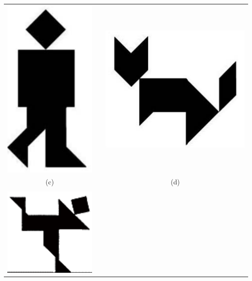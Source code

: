 \begin{problem}
\begin{center}
\begin{tabular}{ccc}
\includegraphics[scale=0.4]{tangram3} & 
\qquad \qquad\qquad& 
\includegraphics[scale=0.4]{tangram4}\\
(c) && (d)\\
\\
\includegraphics[scale=0.7]{tangram5} & 

\end{tabular}
\end{center}
\end{problem}
